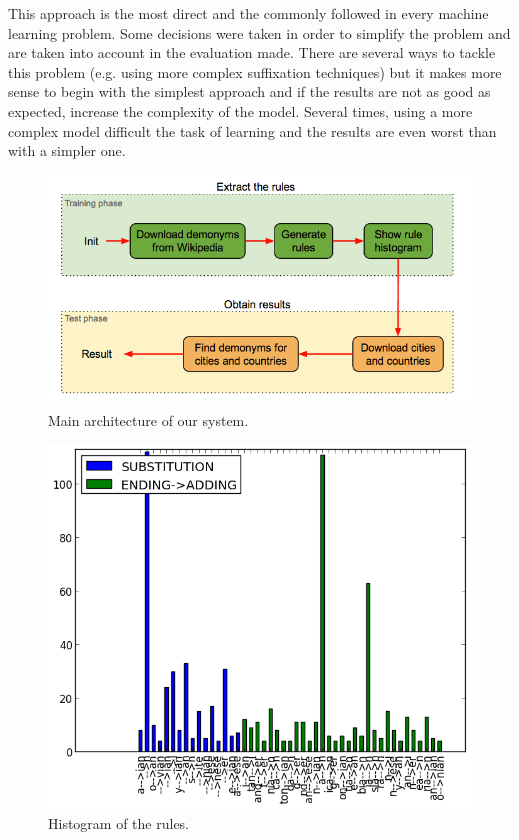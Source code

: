 \documentclass[]{report}
\begin{document}
This approach is the most direct and the commonly followed in every machine learning problem. Some decisions were taken in order to simplify the problem and are taken into account in the evaluation made. There are several ways to tackle this problem (e.g. using more complex suffixation techniques) but it makes more sense to begin with the simplest approach and if the results are not as good as expected, increase the complexity of the model. Several times, using a more complex model difficult the task of learning and the results are even worst than with a simpler one.

\begin{figure}[htb!]
\centering
\includegraphics[scale=0.5]{img/architecture}
\caption{Main architecture of our system.}
\label{Main architecture of our system.}
\end{figure}

\begin{figure}[htb!]
\centering
\includegraphics[scale=0.6]{img/rules}
\caption{Histogram of the rules.}
\label{Histogram of the rules.}
\end{figure}
\end{document}
